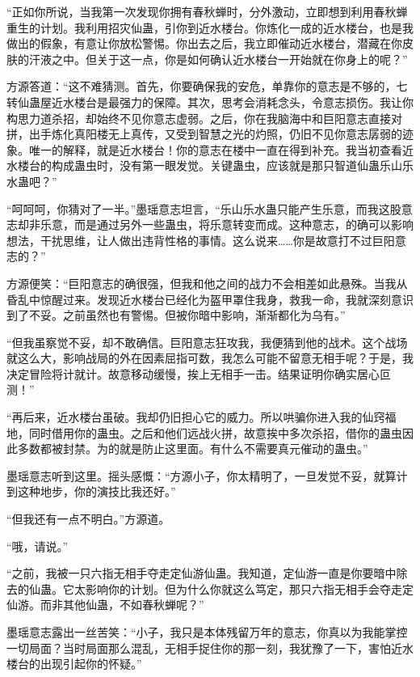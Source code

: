 
\begin{this_body}

“正如你所说，当我第一次发现你拥有春秋蝉时，分外激动，立即想到利用春秋蝉重生的计划。我利用招灾仙蛊，引你到近水楼台。你炼化一成的近水楼台，也是我做出的假象，有意让你放松警惕。你出去之后，我立即催动近水楼台，潜藏在你皮肤的汗液之中。但关于这一点，你是如何确认近水楼台一开始就在你身上的呢？”

方源答道：“这不难猜测。首先，你要确保我的安危，单靠你的意志是不够的，七转仙蛊屋近水楼台是最强力的保障。其次，思考会消耗念头，令意志损伤。我让你构思力道杀招，却始终不见你意志虚弱。之后，你在我脑海中和巨阳意志直接对拼，出手炼化真阳楼无上真传，又受到智慧之光的灼照，仍旧不见你意志孱弱的迹象。唯一的解释，就是近水楼台！你的意志在楼中一直在得到补充。我当初查看近水楼台的构成蛊虫时，没有第一眼发觉。关键蛊虫，应该就是那只智道仙蛊乐山乐水蛊吧？”

“呵呵呵，你猜对了一半。”墨瑶意志坦言，“乐山乐水蛊只能产生乐意，而我这股意志却非乐意，而是通过另外一些蛊虫，将乐意转变而成。这种意志，的确可以影响想法，干扰思维，让人做出违背性格的事情。这么说来……你是故意打不过巨阳意志的？”

方源便笑：“巨阳意志的确很强，但我和他之间的战力不会相差如此悬殊。当我从昏乱中惊醒过来。发现近水楼台已经化为盔甲罩住我身，救我一命，我就深刻意识到了不妥。之前虽然也有警惕。但被你暗中影响，渐渐都化为乌有。”

“但我虽察觉不妥，却不敢确信。巨阳意志狂攻我，我便猜到他的战术。这个战场就这么大，影响战局的外在因素屈指可数，我怎么可能不留意无相手呢？于是，我决定冒险将计就计。故意移动缓慢，挨上无相手一击。结果证明你确实居心叵测！”

“再后来，近水楼台虽破。我却仍旧担心它的威力。所以哄骗你进入我的仙窍福地，同时借用你的蛊虫。之后和他们远战火拼，故意挨中多次杀招，借你的蛊虫因此多数都被封禁。为的就是防止这里面。有什么不需要真元催动的蛊虫。”

墨瑶意志听到这里。摇头感慨：“方源小子，你太精明了，一旦发觉不妥，就算计到这种地步，你的演技比我还好。”

“但我还有一点不明白。”方源道。

“哦，请说。”

“之前，我被一只六指无相手夺走定仙游仙蛊。我知道，定仙游一直是你要暗中除去的仙蛊。它太影响你的计划。但为什么你就这么笃定，那只六指无相手会夺走定仙游。而非其他仙蛊，不如春秋蝉呢？”

墨瑶意志露出一丝苦笑：“小子，我只是本体残留万年的意志，你真以为我能掌控一切局面？当时局面那么混乱，无相手捉住你的那一刻，我犹豫了一下，害怕近水楼台的出现引起你的怀疑。”


\end{this_body}
